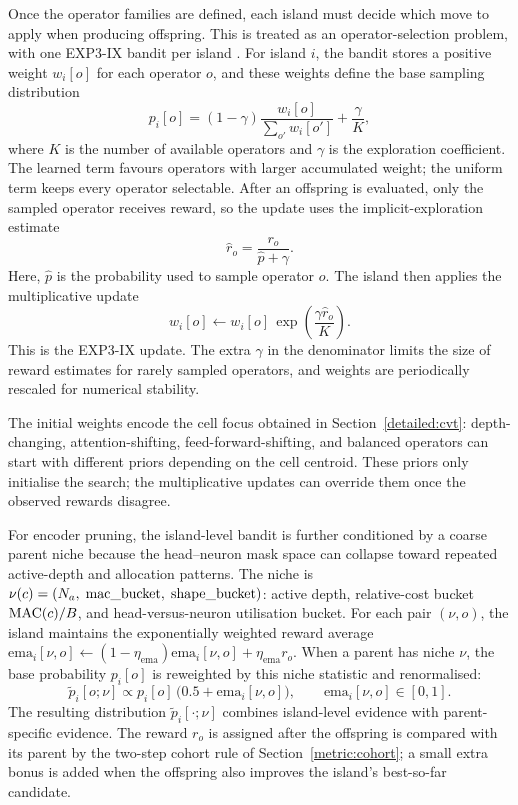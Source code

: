 Once the operator families are defined, each island must decide which move to apply when producing offspring. This is treated as an operator-selection problem, with one EXP3-IX bandit per island \citep[see Appendix~\ref{sec:appendix_exp3ix}]{auer2002nonstochastic,neu2015explore}. For island $i$, the bandit stores a positive weight $w_i[o]$ for each operator $o$, and these weights define the base sampling distribution
\[
p_i[o]
=
(1-\gamma)
\frac{w_i[o]}{\sum_{o'}w_i[o']}
+
\frac{\gamma}{K},
\]
where $K$ is the number of available operators and $\gamma$ is the exploration coefficient. The learned term favours operators with larger accumulated weight; the uniform term keeps every operator selectable. After an offspring is evaluated, only the sampled operator receives reward, so the update uses the implicit-exploration estimate
\[
\hat r_o
=
\frac{r_o}{\hat p+\gamma}.
\]
Here, $\hat p$ is the probability used to sample operator $o$. The island then applies the multiplicative update
\[
w_i[o]
\leftarrow
w_i[o]\,
\exp\!\left(
\frac{\gamma\hat r_o}{K}
\right).
\]
This is the EXP3-IX update. The extra $\gamma$ in the denominator limits the size of reward estimates for rarely sampled operators, and weights are periodically rescaled for numerical stability.

The initial weights encode the cell focus obtained in Section~\ref{detailed:cvt}: depth-changing, attention-shifting, feed-forward-shifting, and balanced operators can start with different priors depending on the cell centroid. These priors only initialise the search; the multiplicative updates can override them once the observed rewards disagree.

For encoder pruning, the island-level bandit is further conditioned by a coarse parent niche because the head--neuron mask space can collapse toward repeated active-depth and allocation patterns. The niche is $\nu(c)=(N_a,\;\mathrm{mac\_bucket},\;\mathrm{shape\_bucket})$: active depth, relative-cost bucket $\mathrm{MAC}(c)/B$, and head-versus-neuron utilisation bucket. For each pair $(\nu,o)$, the island maintains the exponentially weighted reward average $\mathrm{ema}_i[\nu,o]\leftarrow(1-\eta_{\mathrm{ema}})\mathrm{ema}_i[\nu,o]+\eta_{\mathrm{ema}}r_o$. When a parent has niche $\nu$, the base probability $p_i[o]$ is reweighted by this niche statistic and renormalised:
\[
\tilde p_i[o;\nu]
\propto
p_i[o]\,
\big(0.5+\mathrm{ema}_i[\nu,o]\big),
\qquad
\mathrm{ema}_i[\nu,o]\in[0,1].
\]
The resulting distribution $\tilde p_i[\cdot;\nu]$ combines island-level evidence with parent-specific evidence. The reward $r_o$ is assigned after the offspring is compared with its parent by the two-step cohort rule of Section~\ref{metric:cohort}; a small extra bonus is added when the offspring also improves the island's best-so-far candidate.


